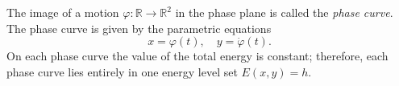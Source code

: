 The image of a motion $\varphi: \mathbb{R} \to \mathbb{R}^2$ in the phase plane is called the \textit{phase curve}.
The phase curve is given by the parametric equations
$$x = \varphi(t), \quad y = \dot{\varphi}(t).$$
On each phase curve the value of the total energy is constant; therefore, each phase curve lies entirely in one energy level set $E(x, y) = h$.
